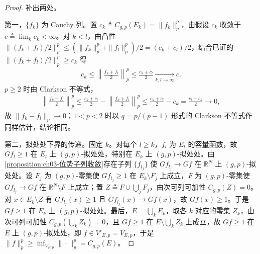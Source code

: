 \documentclass[../../main.tex]{subfiles}%
\begin{document}
\begin{proof}
补出两处。

第一，$\{f_k\}$ 为 Cauchy 列。置 $c_k\triangleq C_{g,p}(E_k)=\|f_k\|_p^p$，由假设 $c_k$ 收敛于 $c\triangleq\lim_kc_k<\infty$。对 $k<l$，由凸性 $\|(f_k+f_l)/2\|_p^p\leqslant(\|f_k\|_p^p+\|f_l\|_p^p)/2=(c_k+c_l)/2$，结合已证的 $\|(f_k+f_l)/2\|_p^p\geqslant c_k$ 得
\begin{align*}
c_k\leqslant\left\|\frac{f_k+f_l}{2}\right\|_p^p\leqslant\frac{c_k+c_l}{2}\xrightarrow[k,l\to\infty]{}c .
\end{align*}
$p\geqslant2$ 时由 Clarkson 不等式，
\begin{align*}
\left\|\frac{f_k-f_l}{2}\right\|_p^p
\leqslant\frac{c_k+c_l}{2}-\left\|\frac{f_k+f_l}{2}\right\|_p^p
\leqslant\frac{c_k+c_l}{2}-c_k=\frac{c_l-c_k}{2}\to0,
\end{align*}
故 $\|f_k-f_l\|_p\to0$；$1<p<2$ 时以 $q=p/(p-1)$ 形式的 Clarkson 不等式作同样估计，结论相同。

第二，拟处处下界的传递。固定 $k$。对每个 $l\geqslant k$，$f_l$ 为 $E_l$ 的容量函数，故 $Gf_l\geqslant1$ 在 $E_l$ 上 $(g,p)$-拟处处，特别在 $E_k$ 上 $(g,p)$-拟处处。由\cref{proposition:ch03-位势子列收敛}存在子列 $\{f_{l_j}\}$ 使 $Gf_{l_j}\to Gf$ 在 $\mathbb{R}^N$ 上 $(g,p)$-拟处处。设 $F_j$ 为 $(g,p)$-零集使 $Gf_{l_j}\geqslant1$ 在 $E_k\setminus F_j$ 上成立，$F$ 为 $(g,p)$-零集使 $Gf_{l_j}\to Gf$ 在 $\mathbb{R}^N\setminus F$ 上成立；置 $Z\triangleq F\cup\bigcup_jF_j$，由次可列可加性 $C_{g,p}(Z)=0$。对 $x\in E_k\setminus Z$ 有 $Gf_{l_j}(x)\geqslant1$ 且 $Gf_{l_j}(x)\to Gf(x)$，故 $Gf(x)\geqslant1$。于是 $Gf\geqslant1$ 在 $E_k$ 上 $(g,p)$-拟处处。最后，$E=\bigcup_kE_k$，取各 $k$ 对应的零集 $Z_k$，由次可列可加性 $C_{g,p}\left(\bigcup_kZ_k\right)=0$，且 $Gf\geqslant1$ 在 $E\setminus\bigcup_kZ_k$ 上成立，故 $Gf\geqslant1$ 在 $E$ 上 $(g,p)$-拟处处，即 $f\in V'_{E,p}=\overline{V_{E,p}}$，于是 $\|f\|_p^p\geqslant\inf_{V_{E,p}}\|\cdot\|_p^p=C_{g,p}(E)$。
\end{proof}
\end{document}
